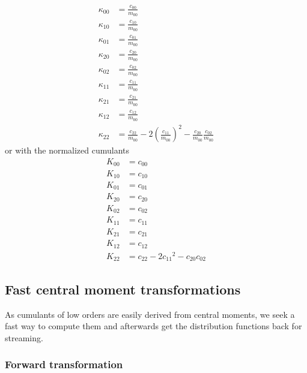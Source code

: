 \documentclass{article}
\begin{document}
\begin{align}
  \label{eq:all cumulants from central moments}
  \kappa_{00} & = \frac{c_{00}}{m_{00}} \\
  \kappa_{10} & = \frac{c_{10}}{m_{00}} \\
  \kappa_{01} & = \frac{c_{01}}{m_{00}} \\
  \kappa_{20} & = \frac{c_{20}}{m_{00}} \\
  \kappa_{02} & = \frac{c_{02}}{m_{00}} \\
  \kappa_{11} & = \frac{c_{11}}{m_{00}} \\
  \kappa_{21} & = \frac{c_{21}}{m_{00}} \\
  \kappa_{12} & = \frac{c_{12}}{m_{00}} \\
  \kappa_{22} & = \frac{c_{22}}{m_{00}} - 2{\left(\frac{c_{11}}{m_{00}}\right)}^2 - \frac{c_{20}}{m_{00}}\frac{c_{02}}{m_{00}}
\end{align}
%
or with the normalized cumulants
\begin{align}
  \label{eq:all normalized cumulants from central moments}
  K_{00} & = c_{00} \\
  K_{10} & = c_{10} \\
  K_{01} & = c_{01} \\
  K_{20} & = c_{20} \\
  K_{02} & = c_{02} \\
  K_{11} & = c_{11} \\
  K_{21} & = c_{21} \\
  K_{12} & = c_{12} \\
  K_{22} & = c_{22} - 2{c_{11}}^2 - c_{20}c_{02}
\end{align}

\subsection{Fast central moment transformations}
\label{sub:Fast central moment transformations}

As cumulants of low orders are easily derived from central moments, we seek a fast way to compute them and afterwards get the distribution functions back for streaming.

\subsubsection{Forward transformation}
\label{subs:Forward transformation}
\end{document}
